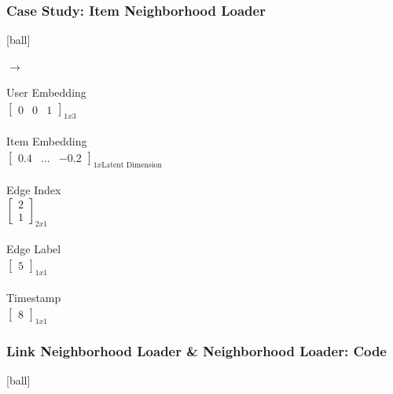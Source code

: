 \documentclass{beamer}
\begin{document}
\begin{frame}[fragile]
\frametitle{Case Study: Item Neighborhood Loader}
[ball]

\begin{minipage}[c]{0.3\textwidth}
    \hspace{1cm}
    
\end{minipage}
\hfill
\begin{minipage}[c]{0.1\textwidth}
    \hspace{1cm}
    $\to$
\end{minipage}
\hfill
\begin{minipage}[c]{0.5\textwidth}
    User Embedding \\ 
    $\begin{bmatrix}
    0 & 0 & 1 
    \end{bmatrix}_{1x3}$ \\~\\
    Item Embedding \\ 
    $\begin{bmatrix}
    0.4 & \ldots & -0.2
    \end{bmatrix}_{1x \text{Latent Dimension}}$ \\~\\
    Edge Index \\
    $\begin{bmatrix}
    2 \\
    1
    \end{bmatrix}_{2x1}$ \\~\\
    Edge Label \\ 
    $\begin{bmatrix}
    5 
    \end{bmatrix}_{1x1}$ \\~\\
    Timestamp \\ 
    $\begin{bmatrix}
    8 
    \end{bmatrix}_{1x1}$
\end{minipage}
\end{frame}


\begin{frame}[fragile]
\frametitle{Link Neighborhood Loader \& Neighborhood Loader: Code}
[ball]



\end{frame}
\end{document}
